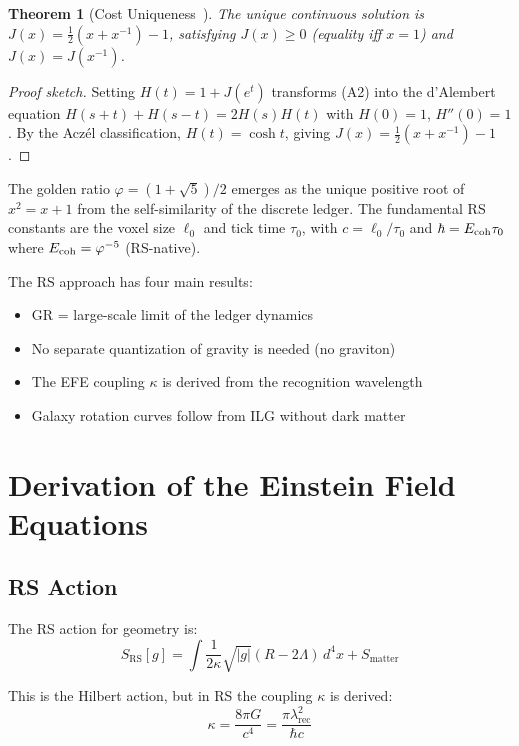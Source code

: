 \documentclass[12pt,a4paper]{article}
\newtheorem{theorem}{Theorem}[section]
\theoremstyle{definition}
\theoremstyle{remark}
\begin{document}
\begin{theorem}[Cost Uniqueness~\cite{RS_Axioms}]
\label{thm:J}
The unique continuous solution is $J(x) = \tfrac{1}{2}(x + x^{-1}) - 1$,
satisfying $J(x) \geq 0$ (equality iff $x=1$) and $J(x) = J(x^{-1})$.
\end{theorem}

\begin{proof}[Proof sketch]
Setting $H(t) = 1 + J(e^t)$ transforms (A2) into the d'Alembert equation
$H(s+t)+H(s-t) = 2H(s)H(t)$ with $H(0)=1$, $H''(0)=1$.  By the Acz\'el
classification, $H(t) = \cosh t$, giving $J(x) = \tfrac{1}{2}(x+x^{-1})-1$.
\end{proof}

The golden ratio $\varphi = (1+\sqrt{5})/2$ emerges as the unique positive root
of $x^2 = x + 1$ from the self-similarity of the discrete ledger.  The fundamental
RS constants are the voxel size $\ell_0$ and tick time $\tau_0$, with
$c = \ell_0/\tau_0$ and $\hbar = E_{\rm coh}\tau_0$ where $E_{\rm coh} = \varphi^{-5}$
(RS-native).

The RS approach has four main results:
\begin{itemize}[nosep]
\item GR = large-scale limit of the ledger dynamics
\item No separate quantization of gravity is needed (no graviton)
\item The EFE coupling $\kappa$ is derived from the recognition wavelength
\item Galaxy rotation curves follow from ILG without dark matter
\end{itemize}

\section{Derivation of the Einstein Field Equations}
\label{sec:efe}

\subsection{RS Action}

The RS action for geometry is:
\begin{equation}
S_\mathrm{RS}[g] = \int \frac{1}{2\kappa} \sqrt{|g|}(R - 2\Lambda)\, d^4x + S_\mathrm{matter}
\end{equation}

This is the Hilbert action, but in RS the coupling $\kappa$ is derived:
\begin{equation}
\kappa = \frac{8\pi G}{c^4} = \frac{\pi \lambda_\mathrm{rec}^2}{\hbar c}
\end{equation}
\end{document}
